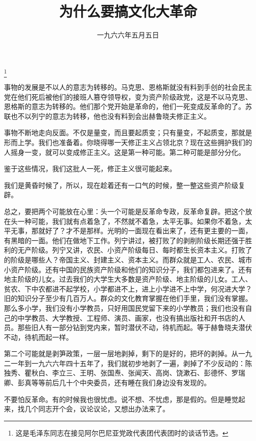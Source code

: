 
\title{为什么要搞文化大革命}
\date{一九六六年五月五日}
\thanks{这是毛泽东同志在接见阿尔巴尼亚党政代表团代表团时的谈话节选。}
\maketitle


事物的发展是不以人的意志为转移的。马克思、恩格斯就没有料到手创的社会民主党在他们死后被他们的接班人篡夺领导权，变为资产阶级政党，这是不以马克思、恩格斯的意志为转移的。他们那个党开始是革命的，他们一死变成反革命的了。苏联也不以列宁的意志为转移，他也没有料到会出赫鲁晓夫修正主义。

事物不断地走向反面。不仅是量变，而且要起质变；只有量变，不起质变，那就是形而上学。我们也准备着。你晓得哪一天修正主义占领北京？现在这些拥护我们的人摇身一变，就可以变成修正主义。这是第一种可能。第二种可能是部分分化。

鉴于这些情况，我们这批人一死，修正主义很可能起来。

我们是黄昏时候了，所以，现在趁着还有一口气的时候，整一整这些资产阶级复辟。

总之，要把两个可能放在心里：头一个可能是反革命专政，反革命复辟。把这个放在头一种可能，我们就有点着急了，不然就不着急，太平无事。如果你不着急，太平无事，那就好了？才不是那样。光明的一面现在看出来了，还有更主要的一面，有黑暗的一面。他们在做地下工作。列宁讲过，被打败了的剥削阶级长期还强于胜利的无产阶级。列宁又讲，农民、小资产阶级每日、每时都生长资本主义。打败了的阶级是哪些人？帝国主义、封建主义、资本主义。而群众就是工人、农民、城市小资产阶级。还有中国的民族资产阶级和他们的知识分子，我们都包进来了。还有地主阶级的儿女。过去我们的大学生大多数是资产阶级、地主阶级的儿女。工人、贫农、下中农都进不起学校，小学都进不上，进上小学进不上中学，何况进大学？旧的知识分子至少有几百万人。群众的文化教育掌握在他们手里，我们没有掌握。那么多小学，我们没有小学教员，只好用国民党留下来的小学教员；我们也没有自己的中学教员、大学教授、工程师、演员、画家，也没有搞出版社和开书店的人员。那些旧人有一部分钻到党内来，暂时潜伏不动，待机而起。等于赫鲁晓夫潜伏不动，待机而起一样。

第二个可能就是剥笋政策，一层一层地剥掉，剩下的是好的，把坏的剥掉。从一九二一年到一九六六年四十五年了，我们就初步地剥了一遍，剥掉了不少反动的：陈独秀、瞿秋白、李立三、王明、张国焘、张闻天、高岗、饶漱石、彭德怀、罗瑞卿、彭真等等前后几十个中央委员，还有睡在我们身边没有发现的。

不要怕反革命。有的时候我也很忧虑。说不想、不忧虑，那是假的。但是睡觉起来，找几个同志开个会，议论议论，又想出办法来了。

